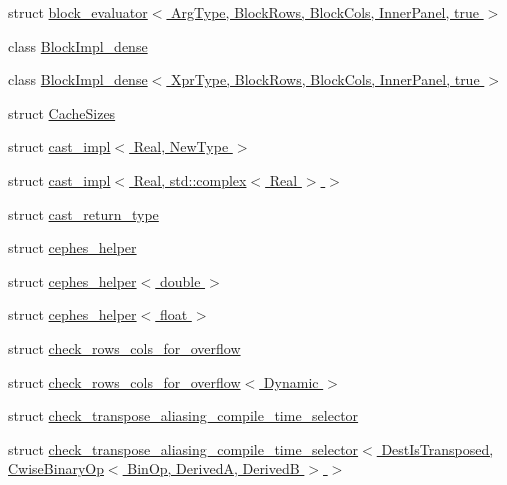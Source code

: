 \begin{DoxyCompactItemize}
\item 
struct \hyperlink{struct_eigen_1_1internal_1_1block__evaluator_3_01_arg_type_00_01_block_rows_00_01_block_cols_00_01_inner_panel_00_01true_01_4}{block\+\_\+evaluator$<$ Arg\+Type, Block\+Rows, Block\+Cols, Inner\+Panel, true $>$}
\item 
class \hyperlink{class_eigen_1_1internal_1_1_block_impl__dense}{Block\+Impl\+\_\+dense}
\item 
class \hyperlink{class_eigen_1_1internal_1_1_block_impl__dense_3_01_xpr_type_00_01_block_rows_00_01_block_cols_00_01_inner_panel_00_01true_01_4}{Block\+Impl\+\_\+dense$<$ Xpr\+Type, Block\+Rows, Block\+Cols, Inner\+Panel, true $>$}
\item 
struct \hyperlink{struct_eigen_1_1internal_1_1_cache_sizes}{Cache\+Sizes}
\item 
struct \hyperlink{struct_eigen_1_1internal_1_1cast__impl_3_01_real_00_01_new_type_01_4}{cast\+\_\+impl$<$ Real, New\+Type $>$}
\item 
struct \hyperlink{struct_eigen_1_1internal_1_1cast__impl_3_01_real_00_01std_1_1complex_3_01_real_01_4_01_4}{cast\+\_\+impl$<$ Real, std\+::complex$<$ Real $>$ $>$}
\item 
struct \hyperlink{struct_eigen_1_1internal_1_1cast__return__type}{cast\+\_\+return\+\_\+type}
\item 
struct \hyperlink{struct_eigen_1_1internal_1_1cephes__helper}{cephes\+\_\+helper}
\item 
struct \hyperlink{struct_eigen_1_1internal_1_1cephes__helper_3_01double_01_4}{cephes\+\_\+helper$<$ double $>$}
\item 
struct \hyperlink{struct_eigen_1_1internal_1_1cephes__helper_3_01float_01_4}{cephes\+\_\+helper$<$ float $>$}
\item 
struct \hyperlink{struct_eigen_1_1internal_1_1check__rows__cols__for__overflow}{check\+\_\+rows\+\_\+cols\+\_\+for\+\_\+overflow}
\item 
struct \hyperlink{struct_eigen_1_1internal_1_1check__rows__cols__for__overflow_3_01_dynamic_01_4}{check\+\_\+rows\+\_\+cols\+\_\+for\+\_\+overflow$<$ Dynamic $>$}
\item 
struct \hyperlink{struct_eigen_1_1internal_1_1check__transpose__aliasing__compile__time__selector}{check\+\_\+transpose\+\_\+aliasing\+\_\+compile\+\_\+time\+\_\+selector}
\item 
struct \hyperlink{struct_eigen_1_1internal_1_1check__transpose__aliasing__compile__time__selector_3_01_dest_is_tra9f4c4ffc0d2b0b4cca6adac98dc1ed17}{check\+\_\+transpose\+\_\+aliasing\+\_\+compile\+\_\+time\+\_\+selector$<$ Dest\+Is\+Transposed, Cwise\+Binary\+Op$<$ Bin\+Op, Derived\+A, Derived\+B $>$ $>$}

\end{DoxyCompactItemize}
